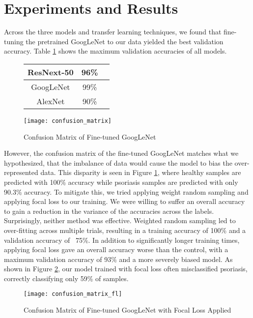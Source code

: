 \documentclass[10pt,twocolumn,letterpaper]{article}
\begin{document}
\section{Experiments and Results}
Across the three models and transfer learning techniques, we found that fine-tuning the pretrained GoogLeNet to our data yielded the best validation accuracy. Table \ref{fig:cm} shows the maximum validation accuracies of all models.
\begin{figure}[H]
\centering
\begin{tabular}{ |c|c|c| }
\hline
 ResNext-50 & 96\% \\
\hline
 GoogLeNet & 99\% \\
\hline
 AlexNet & 90\% \\
\hline
\end{tabular}
\end{figure}
\begin{figure}[htp]
    \centering
    \texttt{[image: confusion\_matrix]}
    \caption{Confusion Matrix of Fine-tuned GoogLeNet}
    \label{fig:cm}
\end{figure}
However, the confusion matrix of the fine-tuned GoogLeNet matches what we hypothesized, that the imbalance of data would cause the model to bias the over-represented data. This disparity is seen in Figure \ref{fig:cm}, where healthy samples are predicted with 100\% accuracy while psoriasis samples are predicted with only 90.3\% accuracy. To mitigate this, we tried applying weight random sampling and applying focal loss to our training. We were willing to suffer an overall accuracy to gain a reduction in the variance of the accuracies across the labels. Surprisingly, neither method was effective. Weighted random sampling led to over-fitting across multiple trials, resulting in a training accuracy of 100\% and a validation accuracy of ~75\%. In addition to significantly longer training times, applying focal loss gave an overall accuracy worse than the control, with a maximum validation accuracy of 93\% and a more severely biased model. As shown in Figure \ref{fig:cmfl}, our model trained with focal loss often misclassified psoriasis, correctly classifying only 59\% of samples.
\begin{figure}[htp]
    \centering
    \texttt{[image: confusion\_matrix\_fl]}
    \caption{Confusion Matrix of Fine-tuned GoogLeNet with Focal Loss Applied}
    \label{fig:cmfl}
\end{figure}
\end{document}

